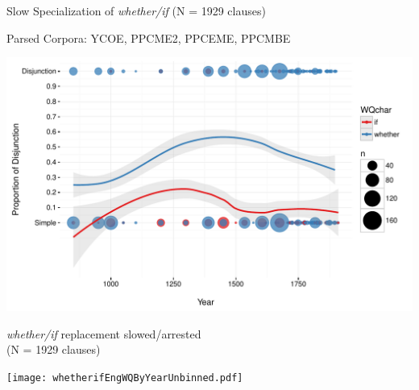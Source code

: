 \documentclass[hyperref={pdfpagelabels=false}]{beamer}
\begin{document}
\begin{frame}{Slow Specialization of \textsl{whether/if} (N = 1929 clauses)} 


\begin{center}
 \small{Parsed Corpora: YCOE, PPCME2, PPCEME, PPCMBE \nocite{ycoe,ppcme2,ppceme,ppcmbe}}

\includegraphics[width=1.1\textwidth]{whetherifEngDisjByYear.pdf}

\end{center}
\end{frame}

\begin{frame}{\textsl{whether/if} replacement slowed/arrested\\\small{(N = 1929 clauses)}}



\texttt{[image: whetherifEngWQByYearUnbinned.pdf]}

\end{frame}
\end{document}
